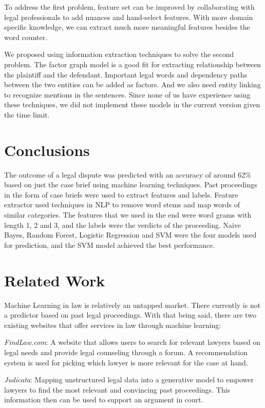 \documentclass[journal]{IEEEtran}
\begin{document}
To address the first problem, feature set can be improved by collaborating with legal professionals to add nuances and hand-select features. With more domain specific knowledge, we can extract much more meaningful features besides the word counter.

We proposed using information extraction techniques to solve the second problem. The factor graph model is a good fit for extracting relationship between the plaintiff and the defendant. Important legal words and dependency paths between the two entities can be added as factors. And we also need entity linking to recognize mentions in the sentences. Since none of us have experience using these techniques, we did not implement these models in the current version given the time limit. 

\section{Conclusions}

The outcome of a legal dispute was predicted with an accuracy of around 62\% based on just the case brief using machine learning techniques. Past proceedings in the form of case briefs were used to extract features and labels. Feature extractor used techniques in NLP to remove word stems and map words of similar categories. The features that we used in the end were word grams with length 1, 2 and 3, and the labels were the verdicts of the proceeding. Naive Bayes, Random Forest, Logistic Regression and SVM were the four models used for prediction, and the SVM model achieved the best performance. 

\section{Related Work}

Machine Learning in law is relatively an untapped market. There currently is not a predictor based on past legal proceedings. With that being said, there are two existing websites that offer services in law through machine learning:

\textit{FindLaw.com}: A website that allows users to search for relevant lawyers based on legal needs and  provide legal counseling through a forum. A recommendation system is used for picking which lawyer is more relevant for the case at hand.

\textit{Judicata}: Mapping unstructured legal data into a generative model to empower lawyers to find the most relevant and convincing past proceedings. This information then can be used to support an argument in court.
\end{document}
